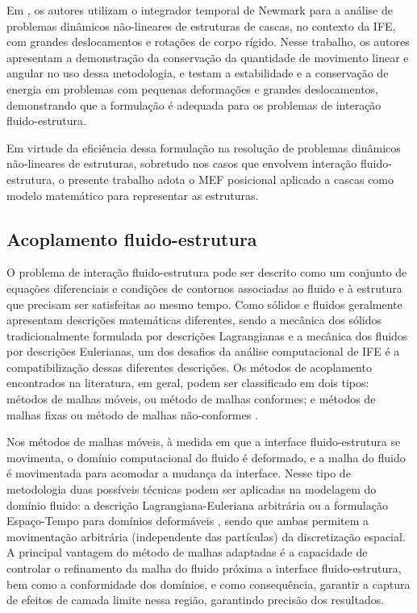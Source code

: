 Em , os autores utilizam o integrador temporal de Newmark para a análise de problemas dinâmicos não-lineares de estruturas de cascas, no contexto da IFE, com grandes deslocamentos e rotações de corpo rígido. Nesse trabalho, os autores apresentam a demonstração da conservação da quantidade de movimento linear e angular no uso dessa metodologia, e testam a estabilidade e a conservação de energia em problemas com pequenas deformações e grandes deslocamentos, demonstrando que a formulação é adequada para os problemas de interação fluido-estrutura.

Em virtude da eficiência dessa formulação na resolução de problemas dinâmicos não-lineares de estruturas, sobretudo nos casos que envolvem interação fluido-estrutura, o presente trabalho adota o MEF posicional aplicado a cascas como modelo matemático para representar as estruturas.

\subsection{Acoplamento fluido-estrutura}
\label{couplingsection}

O problema de interação fluido-estrutura pode ser descrito como um conjunto de equações diferenciais e condições de contornos associadas ao fluido e à estrutura que precisam ser satisfeitas ao mesmo tempo. Como sólidos e fluidos geralmente apresentam descrições matemáticas diferentes, sendo a mecânica dos sólidos tradicionalmente formulada por descrições Lagrangianas e a mecânica dos fluidos por descrições Eulerianas, um dos desafios da análise computacional de IFE é a compatibilização dessas diferentes descrições. Os métodos de acoplamento encontrados na literatura, em geral, podem ser classificado em dois tipos: métodos de malhas móveis, ou método de malhas conformes; e métodos de malhas fixas ou método de malhas não-conformes \cite{BazilevsTT:2013b,Houetal:2012}.

Nos métodos de malhas móveis, à medida em que a interface fluido-estrutura se movimenta, o domínio computacional do fluido é deformado, e a malha do fluido é movimentada para acomodar a mudança da interface. Nesse tipo de metodologia duas possíveis técnicas podem ser aplicadas na modelagem do domínio fluido: a descrição Lagrangiana-Euleriana arbitrária \cite{DoneaGH:1982,HughesLZ:1981,KanchiM:2007} ou a formulação Espaço-Tempo para domínios deformáveis \cite{TakizawaT:2012,TezduyarBL:1992,TezduyarBML:1992b}, sendo que ambas permitem a movimentação arbitrária (independente das partículas) da discretização espacial. A principal vantagem do método de malhas adaptadas é a capacidade de controlar o refinamento da malha do fluido próxima a interface fluido-estrutura, bem como a conformidade dos domínios, e como consequência, garantir a captura de efeitos de camada limite nessa região, garantindo precisão dos resultados.

